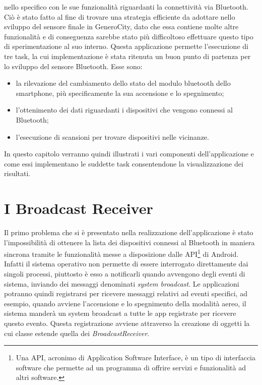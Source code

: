  nello specifico con le sue funzionalità riguardanti la connettività via Bluetooth\cite{ref:bluetooth-doc}. Ciò è stato fatto al fine di trovare una strategia efficiente da adottare nello sviluppo del sensore finale in GeneroCity, dato che essa contiene molte altre funzionalità e di conseguenza sarebbe stato più difficoltoso effettuare questo tipo di sperimentazione al suo interno. Questa applicazione permette l'esecuzione di tre task, la cui implementazione è stata ritenuta un buon punto di partenza per lo sviluppo del sensore Bluetooth. Esse sono:
\begin{itemize}
    \item la rilevazione del cambiamento dello stato del modulo bluetooth dello smartphone, più specificamente la sua accensione e lo spegnimento;
    \item l'ottenimento dei dati riguardanti i dispositivi che vengono connessi al Bluetooth;
    \item l'esecuzione di scansioni per trovare dispositivi nelle vicinanze.
\end{itemize}

In questo capitolo verranno quindi illustrati i vari componenti dell'applicazione e come essi implementano le suddette task consentendone la visualizzazione dei risultati. 

\section{I Broadcast Receiver}
Il primo problema che si è presentato nella realizzazione dell'applicazione è stato l'impossibilità di ottenere la lista dei dispositivi connessi al Bluetooth in maniera sincrona tramite le funzionalità messe a disposizione dalle API\footnote{Una API, acronimo di Application Software Interface, è un tipo di interfaccia software che permette ad un programma di offrire servizi e funzionalità ad altri software.} di Android. Infatti il sistema operativo non permette di essere interrogato direttamente dai singoli processi, piuttosto è esso a notificarli quando avvengono degli eventi di sistema, inviando dei messaggi denominati \textit{system broadcast}. Le applicazioni potranno quindi registrarsi per ricevere messaggi relativi ad eventi specifici, ad esempio, quando avviene l'accensione e lo spegnimento della modalità aereo, il sistema manderà un system broadcast a tutte le app registrate per ricevere questo evento. Questa registrazione avviene attraverso la creazione di oggetti la cui classe estende quella dei \textit{BroadcastReceiver}.\cite{ref:android-broadcast}

